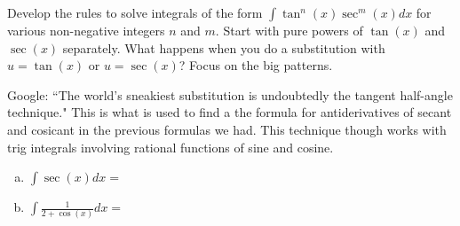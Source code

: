 \documentclass[answers]{exam}
\begin{document}
\begin{questions}
\newpage

\question Develop the rules to solve integrals of the form $\displaystyle \int \tan^n(x)\sec^m(x) dx$ for various non-negative integers $n$ and $m$. Start with pure powers of $\tan(x)$ and $\sec(x)$ separately. What happens when you do a substitution with $u = \tan(x)$ or $u = \sec(x)$? Focus on the big patterns.

\newpage

\question Google: ``The world's sneakiest substitution is undoubtedly the tangent half-angle technique." This is what is used to find a the formula for antiderivatives of secant and cosicant in the previous formulas we had. This technique though works with trig integrals involving rational functions of sine and cosine.
\begin{enumerate}[(a)]
	
	\item $\int \sec(x) dx = $
	
	
	\hfill \break
	\hfill \break
	\hfill \break
	\hfill \break
	\hfill \break
	\hfill \break
	\hfill \break
	\hfill \break
	\hfill \break
	\hfill \break
	\hfill \break
	\hfill \break
	\hfill \break
	\hfill \break
	\hfill \break
	\hfill \break
	
	\vfill
	
	\item $\int \frac{1}{2+\cos(x)} dx =$
	
	\hfill \break
	\hfill \break
	\hfill \break
	\hfill \break
	\hfill \break
	\hfill \break
	\hfill \break
	\hfill \break
	\hfill \break
	\hfill \break
	\hfill \break
	\hfill \break
	\hfill \break
	
\end{enumerate}


\end{questions}
\end{document}
